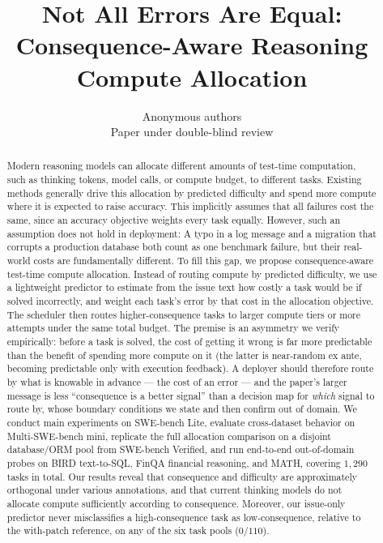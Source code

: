 \documentclass{article}
\title{Not All Errors Are Equal:\\Consequence-Aware Reasoning Compute Allocation}
\author{Anonymous authors\\
Paper under double-blind review}
\begin{document}
\maketitle
\begin{abstract}
Modern reasoning models can allocate different amounts of test-time computation, such as thinking tokens, model calls, or compute budget, to different tasks. Existing methods generally drive this allocation by predicted difficulty and spend more compute where it is expected to raise accuracy. This implicitly assumes that all failures cost the same, since an accuracy objective weights every task equally. However, such an assumption does not hold in deployment: A typo in a log message and a migration that corrupts a production database both count as one benchmark failure, but their real-world costs are fundamentally different. 
To fill this gap,
we propose consequence-aware test-time compute allocation. Instead of routing compute by predicted difficulty, we use a lightweight predictor to estimate from the issue text how costly a task would be if solved incorrectly, and weight each task's error by that cost in the allocation objective. The scheduler then routes higher-consequence tasks to larger compute tiers or more attempts under the same total budget. The premise is an asymmetry we verify empirically: before a task is solved, the cost of getting it wrong is far more predictable than the benefit of spending more compute on it (the latter is near-random ex ante, becoming predictable only with execution feedback). A deployer should therefore route by what is knowable in advance --- the cost of an error --- and the paper's larger message is less ``consequence is a better signal'' than a decision map for \emph{which} signal to route by, whose boundary conditions we state and then confirm out of domain.
We conduct main experiments on SWE-bench Lite, evaluate cross-dataset behavior on Multi-SWE-bench mini, replicate the full allocation comparison on a disjoint database/ORM pool from SWE-bench Verified, and run end-to-end out-of-domain probes on BIRD text-to-SQL,
FinQA financial reasoning, and MATH, covering $1{,}290$ tasks in total. Our results reveal that consequence and difficulty are approximately orthogonal under various annotations, and that current thinking models do not allocate compute sufficiently according to consequence. Moreover, our issue-only predictor never misclassifies a high-consequence task as low-consequence, relative to the with-patch reference, on any of the six task pools ($0/110$). 

\end{abstract}
\end{document}

